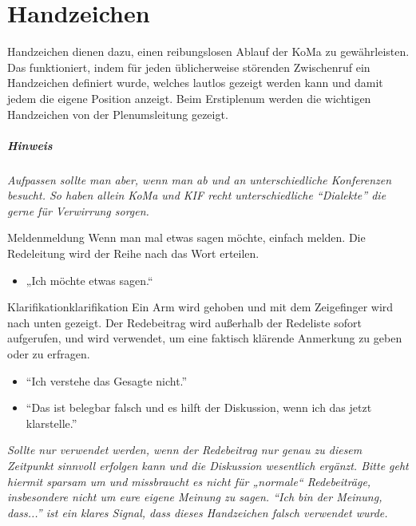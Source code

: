 \chapter{Handzeichen}\label{sec:handzeichen}

Handzeichen dienen dazu, einen reibungslosen Ablauf der KoMa zu gewährleisten.
Das funktioniert, indem für jeden üblicherweise störenden Zwischenruf ein Handzeichen definiert wurde, welches lautlos gezeigt werden kann und damit jedem die eigene Position anzeigt.
Beim Erstiplenum werden die wichtigen Handzeichen von der Plenumsleitung gezeigt.

\paragraph{Hinweis} \emph{Aufpassen sollte man aber, wenn man ab und an unterschiedliche Konferenzen besucht. So haben allein KoMa und KIF recht unterschiedliche \enquote{Dialekte} die gerne für Verwirrung sorgen.}

\begin{handzeichen}[.2\linewidth]{Melden}{meldung}
Wenn man mal etwas sagen möchte, einfach melden. Die Redeleitung wird der Reihe nach das Wort erteilen.
\begin{itemize}
	\item „Ich möchte etwas sagen.“
\end{itemize}
\end{handzeichen}

\begin{handzeichen}{Klarifikation}{klarifikation}
	Ein Arm wird gehoben und mit dem Zeigefinger wird nach unten gezeigt.
	Der Redebeitrag wird außerhalb der Redeliste sofort aufgerufen, und wird verwendet, um eine faktisch klärende Anmerkung zu geben oder zu erfragen.
	\begin{itemize}
		\item \enquote{Ich verstehe das Gesagte nicht.}
		\item \enquote{Das ist belegbar falsch und es hilft der Diskussion, wenn ich das jetzt klarstelle.}
	\end{itemize}
\end{handzeichen}

\emph{Sollte nur verwendet werden, wenn der Redebeitrag nur genau zu diesem Zeitpunkt sinnvoll erfolgen kann und die Diskussion wesentlich ergänzt. Bitte geht hiermit sparsam um und missbraucht es nicht für „normale“ Redebeiträge, insbesondere nicht um eure eigene Meinung zu sagen. \enquote{Ich bin der Meinung, dass...} ist ein klares Signal, dass dieses Handzeichen falsch verwendet wurde.
}

